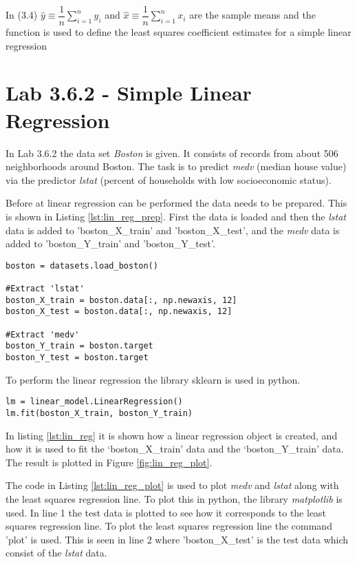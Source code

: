 In (3.4) $\hat{y} \equiv \dfrac{1}{n}\sum\limits_{i=1}^ny_i$ and 
$\hat{x}\equiv \dfrac{1}{n}\sum\limits_{i=1}^nx_i$ are the sample means and the function is used to define the least squares coefficient estimates for a simple linear regression 


\section{Lab 3.6.2 - Simple Linear Regression}


In Lab 3.6.2 the data set \emph{Boston} is given. It consists of records from about 506 neighborhoods around Boston. The task is to predict \emph{medv} (median house value) via the predictor \emph{lstat} (percent of households with low socioeconomic status).

Before at linear regression can be performed the data needs to be prepared. This is shown in Listing \ref{lst:lin_reg_prep}. First the data is loaded and then the \emph{lstat} data is added to 'boston\_X\_train' and 'boston\_X\_test', and the \emph{medv} data is added to 'boston\_Y\_train' and 'boston\_Y\_test'.

\begin{lstlisting}[caption={Data preparation for linear regression}, label=lst:lin_reg_prep, mathescape=true]
boston = datasets.load_boston()

#Extract 'lstat'
boston_X_train = boston.data[:, np.newaxis, 12]
boston_X_test = boston.data[:, np.newaxis, 12]

#Extract 'medv'
boston_Y_train = boston.target
boston_Y_test = boston.target
\end{lstlisting}

To perform the linear regression the library sklearn is used in python. 

\begin{lstlisting}[caption={Python Linear Regression function}, label=lst:lin_reg, mathescape=true]
lm = linear_model.LinearRegression()
lm.fit(boston_X_train, boston_Y_train)
\end{lstlisting}

In listing \ref{lst:lin_reg} it is shown how a linear regression object is created, and how it is used to fit the ‘boston\_X\_train’ data and the ‘boston\_Y\_train’ data.
The result is plotted in Figure \ref{fig:lin_reg_plot}.


The code in Listing \ref{lst:lin_reg_plot} is used to plot \emph{medv} and \emph{lstat} along with the least squares regression line. To plot this in python, the library \emph{matplotlib} is used. In line 1 the test data is plotted to see how it corresponds to the least squares regression line. To plot the least squares regression line the command 'plot' is used. This is seen in line 2 where 'boston\_X\_test' is the test data which consist of the \emph{lstat} data. 


